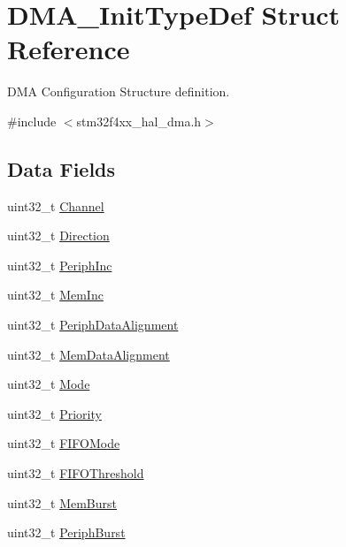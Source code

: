\hypertarget{struct_d_m_a___init_type_def}{}\section{D\+M\+A\+\_\+\+Init\+Type\+Def Struct Reference}
\label{struct_d_m_a___init_type_def}


D\+MA Configuration Structure definition.  




{\ttfamily \#include $<$stm32f4xx\+\_\+hal\+\_\+dma.\+h$>$}

\subsection*{Data Fields}
\begin{DoxyCompactItemize}
\item 
uint32\+\_\+t \mbox{\hyperlink{struct_d_m_a___init_type_def_ae82bf9242a014164f9f6907f29782c44}{Channel}}
\item 
uint32\+\_\+t \mbox{\hyperlink{struct_d_m_a___init_type_def_ab94410c1333b512e271b1c135fe50916}{Direction}}
\item 
uint32\+\_\+t \mbox{\hyperlink{struct_d_m_a___init_type_def_a4925ca3ceb52340daddc92817dc304d9}{Periph\+Inc}}
\item 
uint32\+\_\+t \mbox{\hyperlink{struct_d_m_a___init_type_def_a831756fbcd64feb1e570a9bf743b5b8d}{Mem\+Inc}}
\item 
uint32\+\_\+t \mbox{\hyperlink{struct_d_m_a___init_type_def_aca5b89241171c093fd0fc6dacf72683c}{Periph\+Data\+Alignment}}
\item 
uint32\+\_\+t \mbox{\hyperlink{struct_d_m_a___init_type_def_afe3adac32f5411b1a744c030f398aa5e}{Mem\+Data\+Alignment}}
\item 
uint32\+\_\+t \mbox{\hyperlink{struct_d_m_a___init_type_def_a0ffc93ec511ed9cf1663f6939bd3e839}{Mode}}
\item 
uint32\+\_\+t \mbox{\hyperlink{struct_d_m_a___init_type_def_a72acf77c0b19359eb70764505ae4bd70}{Priority}}
\item 
uint32\+\_\+t \mbox{\hyperlink{struct_d_m_a___init_type_def_a8dc149e98014264da61675f6a0e18b88}{F\+I\+F\+O\+Mode}}
\item 
uint32\+\_\+t \mbox{\hyperlink{struct_d_m_a___init_type_def_a28732ef5d9eae23dbd77e3034cc1bdb3}{F\+I\+F\+O\+Threshold}}
\item 
uint32\+\_\+t \mbox{\hyperlink{struct_d_m_a___init_type_def_a4e6e9f06e5c7903879ed29df299e4df1}{Mem\+Burst}}
\item 
uint32\+\_\+t \mbox{\hyperlink{struct_d_m_a___init_type_def_ae95b14383c9d0c86405939f4bfe2882d}{Periph\+Burst}}
\end{DoxyCompactItemize}


